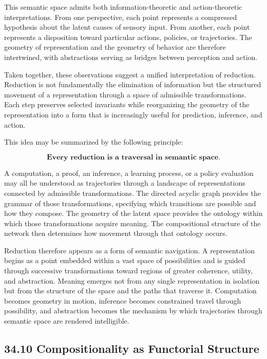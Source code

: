 \documentclass[12pt,letterpaper]{article}
\theoremstyle{remark}
\begin{document}
This semantic space admits both information-theoretic and action-theoretic interpretations. From one perspective, each point represents a compressed hypothesis about the latent causes of sensory input. From another, each point represents a disposition toward particular actions, policies, or trajectories. The geometry of representation and the geometry of behavior are therefore intertwined, with abstractions serving as bridges between perception and action.

Taken together, these observations suggest a unified interpretation of reduction. Reduction is not fundamentally the elimination of information but the structured movement of a representation through a space of admissible transformations. Each step preserves selected invariants while reorganizing the geometry of the representation into a form that is increasingly useful for prediction, inference, and action.

This idea may be summarized by the following principle:

\[
\textbf{Every reduction is a traversal in semantic space.}
\]

A computation, a proof, an inference, a learning process, or a policy evaluation may all be understood as trajectories through a landscape of representations connected by admissible transformations. The directed acyclic graph provides the grammar of those transformations, specifying which transitions are possible and how they compose. The geometry of the latent space provides the ontology within which those transformations acquire meaning. The compositional structure of the network then determines how movement through that ontology occurs.

Reduction therefore appears as a form of semantic navigation. A representation begins as a point embedded within a vast space of possibilities and is guided through successive transformations toward regions of greater coherence, utility, and abstraction. Meaning emerges not from any single representation in isolation but from the structure of the space and the paths that traverse it. Computation becomes geometry in motion, inference becomes constrained travel through possibility, and abstraction becomes the mechanism by which trajectories through semantic space are rendered intelligible.

\subsection{34.10 Compositionality as Functorial Structure}
\end{document}
